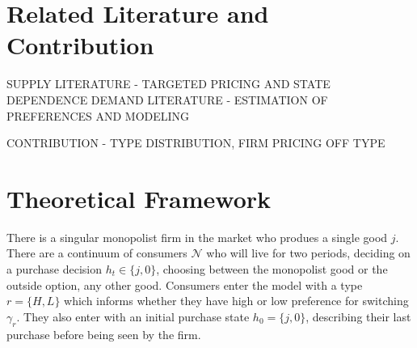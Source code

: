 \documentclass[12pt]{article}
\theoremstyle{definition}
\theoremstyle{remark}
\begin{document}
% 
% 
% 
% 

\section{Related Literature and Contribution}
\label{sec:literature}

SUPPLY LITERATURE - TARGETED PRICING AND STATE DEPENDENCE
DEMAND LITERATURE - ESTIMATION OF PREFERENCES AND MODELING

CONTRIBUTION - TYPE DISTRIBUTION, FIRM PRICING OFF TYPE




\section{Theoretical Framework}
\label{sec:theory}

There is a singular monopolist firm in the market who produes a single good $j$. There are a continuum of consumers $\mathcal{N}$ who will live for two periods, deciding on a purchase decision $h_t \in \{j, 0\}$, choosing between the monopolist good or the outside option, any other good. Consumers enter the model with a type $r = \{H, L\}$ which informs whether they have high or low preference for switching $\gamma_r$. They also enter with an initial purchase state $h_0 = \{j, 0\}$, describing their last purchase before being seen by the firm.
\end{document}
